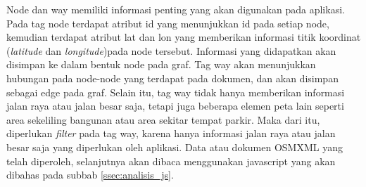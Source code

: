 Node dan way memiliki informasi penting yang akan digunakan pada aplikasi. Pada
tag node terdapat atribut id yang menunjukkan id pada setiap node, kemudian
terdapat atribut lat dan lon yang memberikan informasi titik koordinat
(\textit{latitude} dan \textit{longitude})pada node tersebut. Informasi yang
didapatkan akan disimpan ke dalam bentuk node pada graf. Tag way akan
menunjukkan hubungan pada node-node yang terdapat pada dokumen, dan akan
disimpan sebagai edge pada graf. Selain itu, tag way tidak hanya memberikan
informasi jalan raya atau jalan besar saja, tetapi juga beberapa elemen peta
lain seperti area sekeliling bangunan atau area sekitar tempat parkir. Maka dari
itu, diperlukan \textit{filter} pada tag way, karena hanya informasi jalan raya
atau jalan besar saja yang diperlukan oleh aplikasi. Data atau dokumen OSMXML
yang telah diperoleh, selanjutnya akan dibaca menggunakan javascript yang akan
dibahas pada subbab \ref{ssec:analisis_js}.

